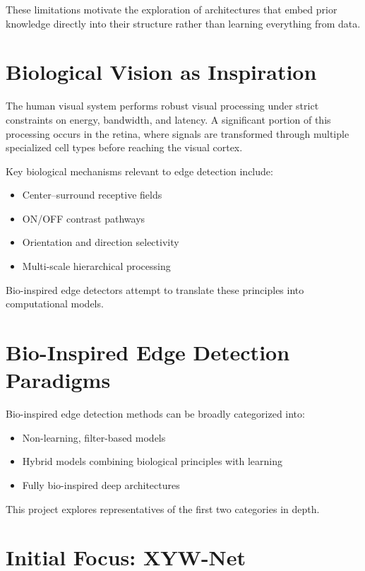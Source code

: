 \documentclass[12pt]{article}
\begin{document}
These limitations motivate the exploration of architectures that embed prior
knowledge directly into their structure rather than learning everything from data.

\section{Biological Vision as Inspiration}

The human visual system performs robust visual processing under strict constraints
on energy, bandwidth, and latency. A significant portion of this processing occurs
in the retina, where signals are transformed through multiple specialized cell
types before reaching the visual cortex.

Key biological mechanisms relevant to edge detection include:
\begin{itemize}
\item Center--surround receptive fields
\item ON/OFF contrast pathways
\item Orientation and direction selectivity
\item Multi-scale hierarchical processing
\end{itemize}

Bio-inspired edge detectors attempt to translate these principles into
computational models.

\section{Bio-Inspired Edge Detection Paradigms}

Bio-inspired edge detection methods can be broadly categorized into:
\begin{itemize}
\item Non-learning, filter-based models
\item Hybrid models combining biological principles with learning
\item Fully bio-inspired deep architectures
\end{itemize}

This project explores representatives of the first two categories in depth.

\section{Initial Focus: XYW-Net}
\end{document}
